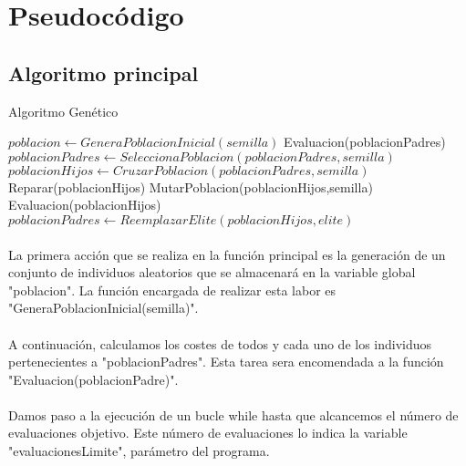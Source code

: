 	\section{Pseudocódigo}
	
	\subsection{Algoritmo principal}
	
		\begin{algorithm}[H]
			\caption{Algoritmo Genético}
			\begin{algorithmic}
				\STATE $poblacion \leftarrow GeneraPoblacionInicial(semilla)$
				\STATE Evaluacion(poblacionPadres)
					\STATE $poblacionPadres \leftarrow SeleccionaPoblacion(poblacionPadres,semilla)$
					\STATE $poblacionHijos \leftarrow CruzarPoblacion(poblacionPadres,semilla)$
					\STATE Reparar(poblacionHijos)
					\STATE MutarPoblacion(poblacionHijos,semilla)
					\STATE Evaluacion(poblacionHijos)
					\STATE $poblacionPadres \leftarrow ReemplazarElite(poblacionHijos, elite)$
				\ENDWHILE	
			\end{algorithmic}
		\end{algorithm}
	
	\paragraph{}La primera acción que se realiza en la función principal es la generación de un conjunto de individuos aleatorios que se almacenará en la variable global "poblacion". La función encargada de realizar esta labor es "GeneraPoblacionInicial(semilla)".
	
	\paragraph{}A continuación, calculamos los costes de todos y cada uno de los individuos pertenecientes a "poblacionPadres". Esta tarea sera encomendada a la función "Evaluacion(poblacionPadre)".
	
	\paragraph{}Damos paso a la ejecución de un bucle while hasta que alcancemos el número de evaluaciones objetivo. Este número de evaluaciones lo indica la variable "evaluacionesLimite", parámetro del programa.
	
